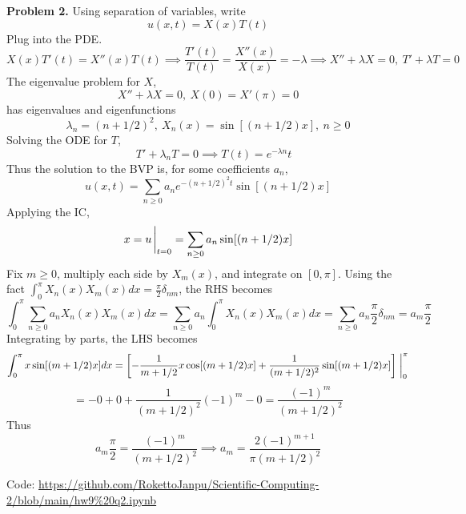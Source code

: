 \documentclass{article}
\def\tbf#1{\textbf{#1}}
\newcommand{\sbr}[1]{\left[#1\right]}
\newcommand{\imp}{\implies}
\begin{document}
\tbf{Problem 2.} Using separation of variables, write
$$u(x,t) = X(x)T(t)$$
Plug into the PDE.
$$X(x)T'(t) = X''(x)T(t)
\imp \frac{T'(t)}{T(t)} = \frac{X''(x)}{X(x)} = -\lambda
\imp X''+\lambda X=0,~T'+\lambda T=0$$
The eigenvalue problem for $X$,
$$X''+\lambda X = 0, ~X(0) = X'(\pi) = 0$$
has eigenvalues and eigenfunctions
$$\lambda_n = (n+1/2)^2,
~X_n(x) = \sin[(n+1/2)x],
~n\ge 0$$
Solving the ODE for $T$,
$$\quad T'+\lambda_n T=0
\imp T(t) = e^{-\lambda n}t$$
Thus the solution to the BVP is, for some coefficients $a_n$,
$$u(x,t) = \sum_{n\ge0}a_ne^{-(n+1/2)^2t}\sin[(n+1/2)x]$$
Applying the IC,
$$x = u\eval_{t=0} = \sum_{n\ge0}a_n\sin[(n+1/2)x]$$
Fix $m\ge0$, multiply each side by $X_m(x)$, and integrate on $[0,\pi]$. Using the fact $\int_0^\pi X_n(x)X_m(x)dx=\frac\pi2\delta_{nm}$, the RHS becomes
$$\int_0^\pi \sum_{n\ge0}a_nX_n(x)X_m(x)dx = \sum_{n\ge0}a_n\int_0^\pi X_n(x)X_m(x)dx
= \sum_{n\ge0}a_n\frac\pi2 \delta_{nm}
= a_m\frac\pi2$$
Integrating by parts, the LHS becomes
$$\int_0^\pi x\sin[(m+1/2)x]dx = \sbr{-\frac{1}{m+1/2}x\cos[(m+1/2)x] + \frac{1}{(m+1/2)^2}\sin[(m+1/2)x]}\eval_0^\pi$$
$$= -0 + 0 + \frac{1}{(m+1/2)^2}(-1)^{m} - 0
= \frac{(-1)^{m}}{(m+1/2)^2}$$
Thus
$$a_m\frac\pi2 = \frac{(-1)^{m}}{(m+1/2)^2}
\imp a_m = \frac{2(-1)^{m+1}}{\pi(m+1/2)^2}$$

Code:
\url{https://github.com/RokettoJanpu/Scientific-Computing-2/blob/main/hw9%20q2.ipynb}
\end{document}
